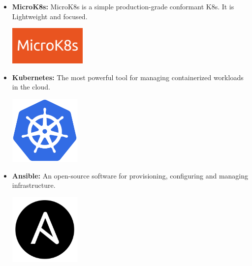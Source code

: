 \begin{itemize}
          \newpage
    \item \textbf{MicroK8s:} \newline \cite{microk8s} MicroK8s is a simple production-grade conformant K8s. It is Lightweight and focused. \newline \newline
          \begin{minipage}{\linewidth}
              \centering
              \includegraphics[width=3.8cm]{src/assets/logos/microk8s.png}
          \end{minipage}
    \item \textbf{Kubernetes:} \newline The most powerful tool for managing containerized workloads in the cloud. \newline
          \begin{minipage}{\linewidth}
              \centering
              \includegraphics[width=3.5cm]{src/assets/logos/kubernetes_512x512.png}
          \end{minipage}
    \item \textbf{Ansible:} \newline An open-source software for provisioning, configuring and managing infrastructure. \newline
          \begin{minipage}{\linewidth}
              \centering
              \includegraphics[width=3.5cm]{src/assets/logos/ansible_200x200.png}
          \end{minipage}


\end{itemize}
